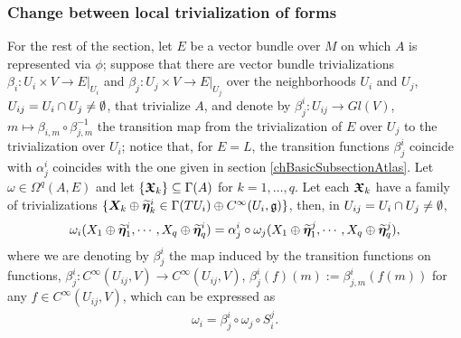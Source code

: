 \subsubsection{Change between local trivialization of forms}

For the rest of the section, let $E$ be a vector bundle over $M$ on which $A$ is represented via $\phi$; suppose that there are vector bundle trivializations $\beta_i:U_i \times V \to E|_{U_i}$ and $\beta_j:U_j \times V \to E|_{U_j}$ over the neighborhoods $U_i$ and $U_j$, $U_{ij} = U_i \cap U_j \neq \emptyset$, that trivialize $A$, and denote by $\beta^i_j: U_{ij} \to Gl(V)$, $m \mapsto \beta_{i, m} \circ \beta_{j, m}^{-1}$ the transition map from the trivialization of $E$ over $U_j$ to the trivialization over $U_i$; notice that, for $E = L$, the transition functions $\beta^i_j$ coincide with $\alpha^i_j$ coincides with the one given in section \ref{chBasicSubsectionAtlas}. Let $\omega \in \Omega^q(A, E)$ and let $\{\bm{\mathfrak{X}}_k\} \subseteq \Gamma(A)$ for $k = 1, \dots, q$. Let each $\bm{\mathfrak{X}}_k$ have a family of trivializations $\{\bm{X}_k \oplus \widetilde{\bm{\eta}}_k^i \in \Gamma(TU_i) \oplus C^\infty(U_i, \mathfrak{g})\}$, then, in $U_{ij} = U_i \cap U_j \neq \emptyset$, 
\begin{align*}
    \omega_i(X_1 \oplus \widetilde{\bm{\eta}}_1^i, \cdots, X_q \oplus \widetilde{\bm{\eta}}_q^i) = \alpha^i_j \circ \omega_j(X_1 \oplus \widetilde{\bm{\eta}}_1^j, \cdots, X_q \oplus \widetilde{\bm{\eta}}_q^j),
\end{align*}
where we are denoting by $\beta^i_j$ the map induced by the transition functions on functions, $\beta^i_j:C^\infty(U_{ij}, V) \to C^\infty(U_{ij}, V)$, $\beta^i_j(f)(m) := \beta^i_{j, m}(f(m))$ for any $f \in C^\infty(U_{ij}, V)$, which can be expressed as
\begin{align}
    \omega_i = \beta^i_j \circ \omega_j \circ S^j_i.
\end{align}

